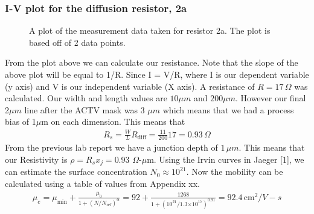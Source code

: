 \documentclass{article}
\providecommand{\e}[1]{\ensuremath{\times 10^{#1}}}
\begin{document}
\subsubsection{I-V plot for the diffusion resistor, 2a}
\begin{figure}[H]
\centering
{}
\caption{A plot of the measurement data taken for resistor 2a. The plot is based off of 2 data points.}
\end{figure}

From the plot above we can calculate our resistance. Note that the slope of the above plot will be equal to 1/R. Since I = V/R, where I is our dependent variable (y axis) and V is our independent variable (X axis). A resistance of $R = 17 \,\Omega$ was calculated. Our width and length values are $10 \mu m$ and $200 \mu m$. However our final 2$\mu m$ line after the ACTV mask was 3 $\mu m$ which means that we had a process bias of 1$\mu$m on each dimension. This means that
\begin{align*}
R_s = \frac{W}{L}R_{\text{diff}} = \frac{11}{200}17 = 0.93 \,\Omega
\end{align*}
From the previous lab report we have a junction depth of $1\,\mu m$. This means that our Resistivity is $\rho = R_s x_j = 0.93$ $\Omega$-$\mu$m. Using the Irvin curves in Jaeger [1], we can estimate the surface concentration $N_0 \approx 10^{21}$. Now the mobility can be calculated using a table of values from Appendix xx.
\begin{align*}
\mu_e = \mu_{\text{min}} + \frac{\mu_0}{1 + (N/N_{\text{ref}})^{\alpha}} = 92 + \frac{1268}{1 + (10^{21}/1.3\e{17})^{0.91}} = 92.4 \,\text{cm}^2 /V-s
\end{align*}
\end{document}
